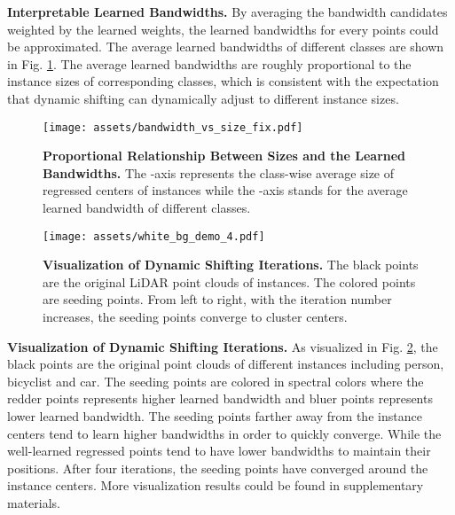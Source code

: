 \documentclass[final]{cvpr}
\begin{document}
\noindent\textbf{Interpretable Learned Bandwidths.}
By averaging the bandwidth candidates weighted by the learned weights, the learned bandwidths for every
points could be approximated.
The average learned bandwidths of different classes are shown in Fig.
\ref{fig:04_04_class_bandwidth}.
The average learned bandwidths are roughly proportional to the instance sizes of corresponding classes, which is
consistent with the expectation that dynamic shifting can dynamically adjust to different instance sizes.
\begin{figure}[ht]
    \vspace{-0.25cm}
    \begin{center}
\texttt{[image: assets/bandwidth\_vs\_size\_fix.pdf]}
    \end{center}
    \vspace{-0.8cm}
    \caption{\textbf{Proportional Relationship Between Sizes and the Learned Bandwidths.} The -axis represents the class-wise average size of regressed centers of instances while the -axis stands for the average learned bandwidth of different \things{} classes.}
\label{fig:04_04_class_bandwidth}
    \vspace{-0.2cm}
\end{figure} \begin{figure}[ht]
    \begin{center}
\texttt{[image: assets/white\_bg\_demo\_4.pdf]}
    \end{center}
    \vspace{-0.6cm}
    \caption{\textbf{Visualization of Dynamic Shifting Iterations.} The black points are the original LiDAR point clouds of instances. The colored points are seeding points. From left to right, with the iteration number increases, the seeding points converge to cluster centers.}
    \label{fig:04_04_diffpart_bandwidth}
\end{figure} 


\noindent\textbf{Visualization of Dynamic Shifting Iterations.}
As visualized in Fig. \ref{fig:04_04_diffpart_bandwidth}, the black points are
the original point clouds of different instances including person, bicyclist and car.
The seeding points are colored in spectral colors where the redder points represents higher learned bandwidth
and bluer points represents lower learned bandwidth.
The seeding points farther away from the instance centers tend to learn higher
bandwidths in order to quickly converge.
While the well-learned regressed points tend to have lower bandwidths to maintain their positions.
After four iterations, the seeding points have converged around the instance centers.
More visualization results could be found in supplementary materials.
 
\end{document}
